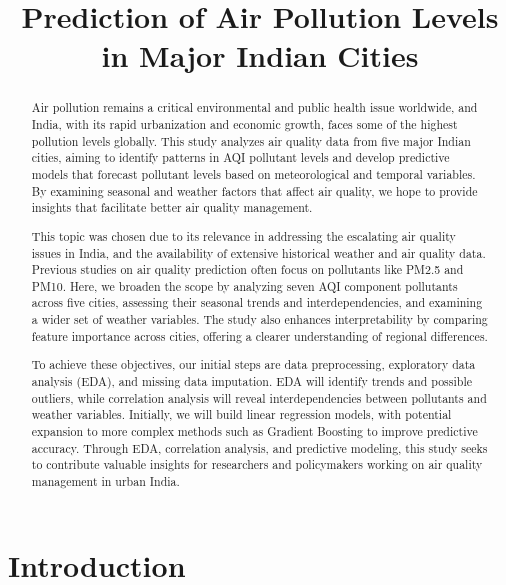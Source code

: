 \documentclass[12pt]{article}
\title{Prediction of Air Pollution Levels in Major Indian Cities}
\author{}
\date{}
\begin{document}
\maketitle


\begin{abstract}
Air pollution remains a critical environmental and public health issue worldwide, and India, with its rapid urbanization and economic growth, faces some of the highest pollution levels globally. This study analyzes air quality data from five major Indian cities, aiming to identify patterns in AQI pollutant levels and develop predictive models that forecast pollutant levels based on meteorological and temporal variables. By examining seasonal and weather factors that affect air quality, we hope to provide insights that facilitate better air quality management.

This topic was chosen due to its relevance in addressing the escalating air quality issues in India, and the availability of extensive historical weather and air quality data.
Previous studies on air quality prediction often focus on pollutants like PM2.5 and PM10. Here, we broaden the scope by analyzing seven AQI component pollutants across five cities, assessing their seasonal trends and interdependencies, and examining a wider set of weather variables. The study also enhances interpretability by comparing feature importance across cities, offering a clearer understanding of regional differences.

To achieve these objectives, our initial steps are data preprocessing, exploratory data analysis (EDA), and missing data imputation. EDA will identify trends and possible outliers, while correlation analysis will reveal interdependencies between pollutants and weather variables. Initially, we will build linear regression models, with potential expansion to more complex methods such as Gradient Boosting to improve predictive accuracy. Through EDA, correlation analysis, and predictive modeling, this study seeks to contribute valuable insights for researchers and policymakers working on air quality management in urban India.
\end{abstract}

\newpage

\tableofcontents

\newpage

\section{Introduction}
\end{document}
